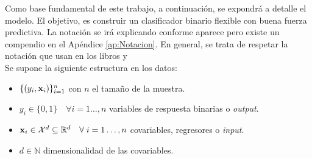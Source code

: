 \documentclass[../Main/Main.tex]{subfiles}
\begin{document}
Como base fundamental de este trabajo, a continuación, se expondrá a detalle el modelo. El objetivo, es construir un clasificador binario flexible con buena fuerza predictiva. La notación se irá explicando conforme aparece pero existe un compendio en el Apéndice \ref{ap:Notacion}. En general, se trata de respetar la notación que usan en los libros \autocite{hastie2008elements} y \autocite{james2013introduction}\\

Se supone la siguiente estructura en los datos:
\begin{itemize}
	\item $\{(y_i,\mathbf{x}_i)\}_{i = 1}^n$ con $n$ el tamaño de la muestra.
	\item $y_i \in \{0,1\}\quad \forall i = 1\ldots,n$  variables de respuesta binarias o \textit{output}.
	\item $\mathbf{x}_i \in \mathcal{X}^d \subseteq \mathbb{R}^d \quad \forall \; i = 1\ldots,n$ covariables, regresores o \textit{input}.
	\item $d \in \mathbb{N}$ dimensionalidad de las covariables.
\end{itemize}
\end{document}
